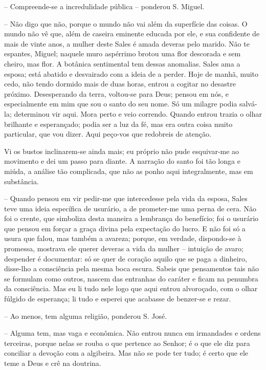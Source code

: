 -- Compreende-se a incredulidade pública -- ponderou S. Miguel.

-- Não digo que não, porque o mundo não vai além da superfície das
coisas. O mundo não vê que, além de caseira eminente educada por ele, e
sua confidente de mais de vinte anos, a mulher deste Sales é amada
deveras pelo marido. Não te espantes, Miguel; naquele muro aspérrimo
brotou uma flor descorada e sem cheiro, mas flor. A botânica sentimental
tem dessas anomalias. Sales ama a esposa; está abatido e desvairado com
a ideia de a perder. Hoje de manhã, muito cedo, não tendo dormido mais
de duas horas, entrou a cogitar no desastre próximo. Desesperando da
terra, voltou-se para Deus; pensou em nós, e especialmente em mim que
sou o santo do seu nome. Só um milagre podia salvá-la; determinou vir
aqui. Mora perto e veio correndo. Quando entrou trazia o olhar brilhante
e esperançado; podia ser a luz da fé, mas era outra coisa muito
particular, que vou dizer. Aqui peço-vos que redobreis de atenção.

Vi os bustos inclinarem-se ainda mais; eu próprio não pude esquivar-me
ao movimento e dei um passo para diante. A narração do santo foi tão
longa e miúda, a análise tão complicada, que não as ponho aqui
integralmente, mas em substância.

-- Quando pensou em vir pedir-me que intercedesse pela vida da esposa,
Sales teve uma ideia específica de usurário, a de prometer-me uma perna
de cera. Não foi o crente, que simboliza desta maneira a lembrança do
benefício; foi o usurário que pensou em forçar a graça divina pela
expectação do lucro. E não foi só a usura que falou, mas também a
avareza; porque, em verdade, dispondo-se à promessa, mostrava ele querer
deveras a vida da mulher -- intuição de avaro; despender é documentar:
só se quer de coração aquilo que se paga a dinheiro, disse-lho a
consciência pela mesma boca escura. Sabeis que pensamentos tais não se
formulam como outros, nascem das entranhas do caráter e ficam na
penumbra da consciência. Mas eu li tudo nele logo que aqui entrou
alvoroçado, com o olhar fúlgido de esperança; li tudo e esperei que
acabasse de benzer-se e rezar.

-- Ao menos, tem alguma religião, ponderou S. José.

-- Alguma tem, mas vaga e econômica. Não entrou nunca em irmandades e
ordens terceiras, porque nelas se rouba o que pertence ao Senhor; é o
que ele diz para conciliar a devoção com a algibeira. Mas não se pode
ter tudo; é certo que ele teme a Deus e crê na doutrina.

